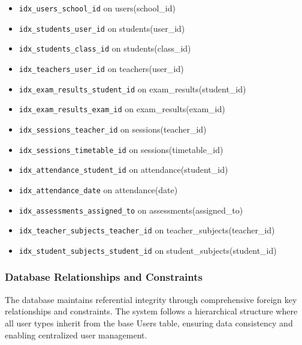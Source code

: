 \documentclass[12pt,a4paper]{report}
\begin{document}
\begin{itemize}
    \item \texttt{idx\_users\_school\_id} on users(school\_id)
    \item \texttt{idx\_students\_user\_id} on students(user\_id)
    \item \texttt{idx\_students\_class\_id} on students(class\_id)
    \item \texttt{idx\_teachers\_user\_id} on teachers(user\_id)
    \item \texttt{idx\_exam\_results\_student\_id} on exam\_results(student\_id)
    \item \texttt{idx\_exam\_results\_exam\_id} on exam\_results(exam\_id)
    \item \texttt{idx\_sessions\_teacher\_id} on sessions(teacher\_id)
    \item \texttt{idx\_sessions\_timetable\_id} on sessions(timetable\_id)
    \item \texttt{idx\_attendance\_student\_id} on attendance(student\_id)
    \item \texttt{idx\_attendance\_date} on attendance(date)
    \item \texttt{idx\_assessments\_assigned\_to} on assessments(assigned\_to)
    \item \texttt{idx\_teacher\_subjects\_teacher\_id} on teacher\_subjects(teacher\_id)
    \item \texttt{idx\_student\_subjects\_student\_id} on student\_subjects(student\_id)
\end{itemize}

\subsubsection{Database Relationships and Constraints}

The database maintains referential integrity through comprehensive foreign key relationships and constraints. The system follows a hierarchical structure where all user types inherit from the base Users table, ensuring data consistency and enabling centralized user management.
\end{document}
